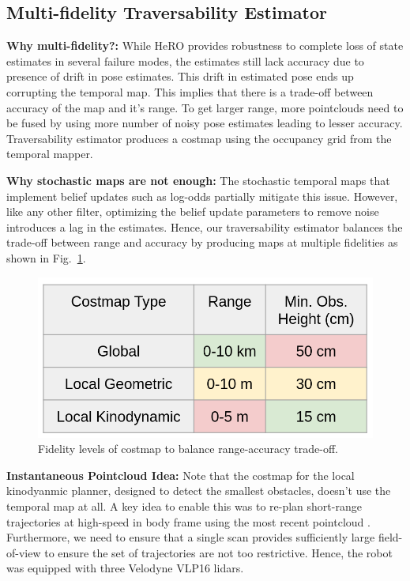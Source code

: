 \documentclass[letterpaper, 10 pt, conference]{ieeeconf}  %
\newcommand{\pr}[1]{\textbf{#1:}}  %
\begin{document}
\subsection{Multi-fidelity Traversability Estimator}

\pr{Why multi-fidelity?} 
While HeRO provides robustness to complete loss of state estimates in several failure modes, the estimates still lack accuracy due to presence of drift in pose estimates.
This drift in estimated pose ends up corrupting the temporal map.
This implies that there is a trade-off between accuracy of the map and it's range.
To get larger range, more pointclouds need to be fused by using more number of noisy pose estimates leading to lesser accuracy. 
Traversability estimator produces a costmap using the occupancy grid from the temporal mapper.

\pr{Why stochastic maps are not enough}
The stochastic temporal maps that implement belief updates such as log-odds \cite{hornung2013octomap} partially mitigate this issue.
However, like any other filter, optimizing the belief update parameters to remove noise introduces a lag in the estimates.
Hence, our traversability estimator balances the trade-off between range and accuracy by producing maps at multiple fidelities as shown in Fig.~\ref{fig:costmap}. 

\begin{figure}[h!]
    \centering
    \includegraphics[width=\linewidth]{Traversability/figs/CostmapTable.png}
    \caption{Fidelity levels of costmap to balance range-accuracy trade-off.}
    \label{fig:costmap}
\end{figure}

\pr{Instantaneous Pointcloud Idea}
Note that the costmap for the local kinodyanmic planner, designed to detect the smallest obstacles, doesn't use the temporal map at all.
A key idea to enable this was to re-plan short-range trajectories at high-speed in body frame using the most recent pointcloud \cite{instantaneousPointclouds}.
Furthermore, we need to ensure that a single scan provides sufficiently large field-of-view to ensure the set of trajectories are not too restrictive.
Hence, the robot was equipped with three Velodyne VLP16 lidars.
\end{document}
